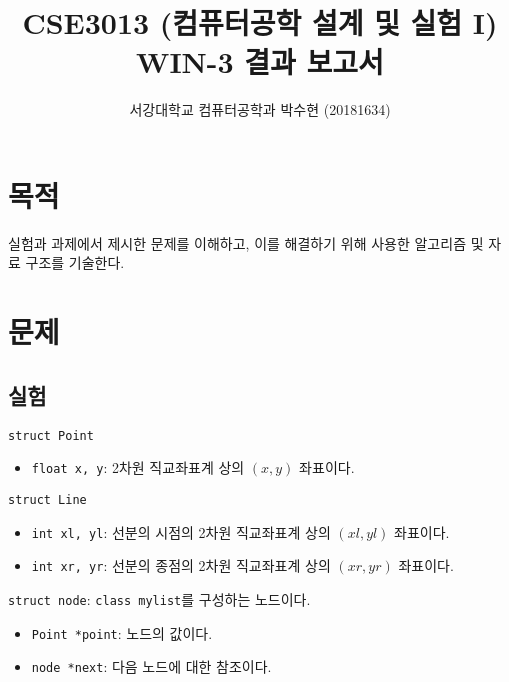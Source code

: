 
	


\title{CSE3013 (컴퓨터공학 설계 및 실험 I) \space \newline WIN-3 결과 보고서}
\author{서강대학교 컴퓨터공학과 박수현 (20181634)}
\maketitle

\section{목적}
실험과 과제에서 제시한 문제를 이해하고, 이를 해결하기 위해 사용한 알고리즘 및 자료 구조를 기술한다.

\section{문제}

\subsection{실험}

\texttt{struct Point}
\begin{itemize}
	\item \texttt{float x, y}: 2차원 직교좌표계 상의 $\left(x, y\right)$ 좌표이다.
\end{itemize}

\texttt{struct Line}
\begin{itemize}
	\item \texttt{int xl, yl}: 선분의 시점의 2차원 직교좌표계 상의 $\left(xl, yl\right)$ 좌표이다.
	\item \texttt{int xr, yr}: 선분의 종점의 2차원 직교좌표계 상의 $\left(xr, yr\right)$ 좌표이다.
\end{itemize}

\texttt{struct node}: \texttt{class mylist}를 구성하는 노드이다.
\begin{itemize}
	\item \texttt{Point *point}: 노드의 값이다.
	\item \texttt{node *next}: 다음 노드에 대한 참조이다.
\end{itemize}

